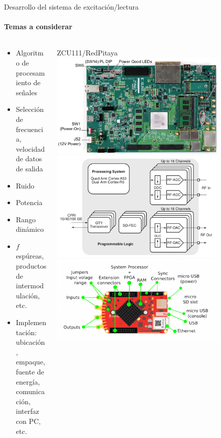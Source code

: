 \documentclass[ignorenonframetext,12pt]{beamer}
\begin{document}
		\begin{frame}{Desarrollo del sistema de excitación/lectura}
			\framesubtitle{Temas a considerar}
			\begin{columns}
				\begin{column}{0.5\textwidth}
					\normalsize{\begin{itemize}
						\item Algoritmo de procesamiento de señales
						\item Selección de frecuencia, velocidad de datos de salida
						\item Ruido
						\item Potencia
						\item Rango dinámico
						\item $f$ espúreas, productos de intermodulación, etc.
						\item Implementación: ubicación, empaque, fuente de
							energía, comunicación, interfaz con PC, etc.
					\end{itemize}}
				\end{column}
				\begin{column}{0.5\textwidth}
					ZCU111/RedPitaya
					\includegraphics[width=0.8\textwidth]{zcu2}
					\includegraphics[width=0.8\textwidth]{zcu1}
					\includegraphics[width=0.8\textwidth]{600px-RedPitaya_HW_overview}
				\end{column}
			\end{columns}
		\end{frame}
\end{document}
